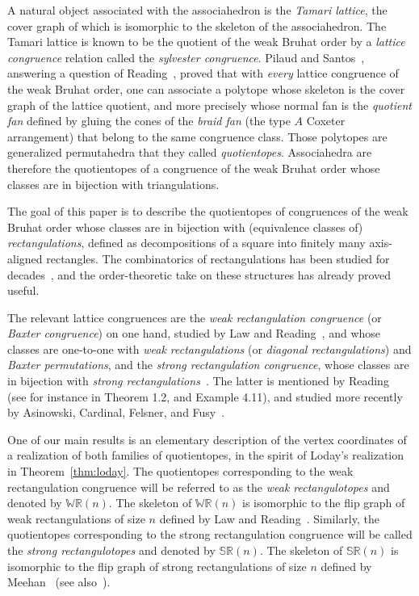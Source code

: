 \documentclass{amsart}
\theoremstyle{definition}
\newcommand{\darkblue}{\color{darkblue}} %
\newcommand{\defn}[1]{\textsl{\darkblue #1}} %
\newcommand{\polytope}[1]{\mathds{#1}} %
\newcommand{\WRP}{\polytope{WR}} %
\newcommand{\SRP}{\polytope{SR}} %
\begin{document}
A natural object associated with the associahedron is the \defn{Tamari lattice}, the cover graph of which is isomorphic to the skeleton of the associahedron.
The Tamari lattice is known to be the quotient of the weak Bruhat order by a \defn{lattice congruence} relation called the \defn{sylvester congruence}.
Pilaud and Santos~\cite{MR3964495}, answering a question of Reading~\cite{MR2142177}, proved that with \emph{every} lattice congruence of the weak Bruhat order, one can associate a polytope whose skeleton is the cover graph of the lattice quotient, and more precisely whose normal fan is the \defn{quotient fan} defined by gluing the cones of the \defn{braid fan} (the type $A$ Coxeter arrangement) that belong to the same congruence class.
Those polytopes are generalized permutahedra that they called \defn{quotientopes}.
Associahedra are therefore the quotientopes of a congruence of the weak Bruhat order whose classes are in bijection with triangulations.

The goal of this paper is to describe the quotientopes of congruences of the weak Bruhat order whose classes are in bijection with (equivalence classes of) \defn{rectangulations}, defined as decompositions of a square into finitely many axis-aligned rectangles.
The combinatorics of rectangulations has been studied for decades~\cite{MR2233287,MR2871762,MR2864445,MR2763051,MR3084577,MR3878132,MR4598046}, and the order-theoretic take on these structures has already proved useful.

The relevant lattice congruences are the \defn{weak rectangulation congruence} (or \defn{Baxter congruence}) on one hand, studied by Law and Reading~\cite{MR2871762}, and whose classes are one-to-one with \defn{weak rectangulations} (or \defn{diagonal rectangulations}) and \defn{Baxter permutations}, and the \defn{strong rectangulation congruence}, whose classes are in bijection with \defn{strong rectangulations}~\cite{MR2864445}.
The latter is mentioned by Reading~\cite{MR3335492} (see for instance in Theorem 1.2, and Example 4.11), and studied more recently by Asinowski, Cardinal, Felsner, and Fusy~\cite{ACFF24}.

One of our main results is an elementary description of the vertex coordinates of a realization of both families of quotientopes, in the spirit of Loday's realization in Theorem~\ref{thm:loday}.
The quotientopes corresponding to the weak rectangulation congruence will be referred to as the \defn{weak rectangulotopes} and denoted by $\WRP(n)$.
The skeleton of $\WRP(n)$ is isomorphic to the flip graph of weak rectangulations of size $n$ defined by Law and Reading~\cite{MR2871762}.
Similarly, the quotientopes corresponding to the strong rectangulation congruence will be called the \defn{strong rectangulotopes} and denoted by $\SRP(n)$.
The skeleton of $\SRP(n)$ is isomorphic to the flip graph of strong rectangulations of size $n$ defined by Meehan~\cite{MR3697823} (see also~\cite{ACFF24}).
\end{document}
